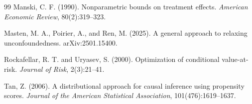 \documentclass[11pt]{article}
\theoremstyle{definition}
\theoremstyle{plain}
\theoremstyle{remark}
\begin{document}
\begin{thebibliography}{99}
Manski, C. F. (1990).
\newblock Nonparametric bounds on treatment effects.
\newblock \emph{American Economic Review}, 80(2):319--323.

Masten, M. A., Poirier, A., and Ren, M. (2025).
\newblock A general approach to relaxing unconfoundedness.
\newblock arXiv:2501.15400.

Rockafellar, R. T. and Uryasev, S. (2000).
\newblock Optimization of conditional value-at-risk.
\newblock \emph{Journal of Risk}, 2(3):21--41.

Tan, Z. (2006).
\newblock A distributional approach for causal inference using propensity
scores.
\newblock \emph{Journal of the American Statistical Association},
101(476):1619--1637.

\end{thebibliography}
\end{document}
